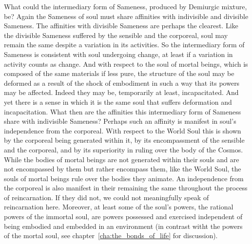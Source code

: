 What could the intermediary form of Sameness, produced by Demiurgic mixture, be? Again the Sameness of soul must share affinities with indivisible and divisible Sameness. The affinities with divisible Sameness are perhaps the clearest. Like the divisible Sameness suffered by the sensible and the corporeal, soul may remain the same despite a variation in its activities. So the intermediary form of Sameness is consistent with soul undergoing change, at least if a variation in activity counts as change. And with respect to the soul of mortal beings, which is composed of the same materials if less pure, the structure of the soul may be deformed as a result of the shock of embodiment in such a way that its powers may be affected. Indeed they may be, temporarily at least, incapacitated. And yet there is a sense in which it is the same soul that suffers deformation and incapacitation. What then are the affinities this intermediary form of Sameness share with indivisible Sameness? Perhaps such an affinity is manifest in soul's independence from the corporeal. With respect to the World Soul this is shown by the corporeal being generated within it, by its encompassment of the sensible and the corporeal, and by its superiority in ruling over the body of the Cosmos. While the bodies of mortal beings are not generated within their souls and are not encompassed by them but rather encompass them, like the World Soul, the souls of mortal beings rule over the bodies they animate. An independence from the corporeal is also manifest in their remaining the same throughout the process of reincarnation. If they did not, we could not meaningfully speak of reincarnation here. Moreover, at least some of the soul's powers, the rational powers of the immortal soul, are powers possessed and exercised independent of being embodied and embedded in an environment (in contrast witht the powers of the mortal soul, see chapter~\ref{cha:the_bonds_of_life} for discussion).


